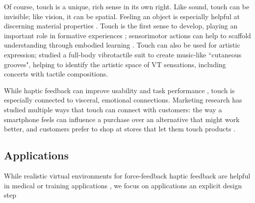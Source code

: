 Of course, touch is a unique, rich sense in its own right.
Like sound, touch can be invisible; like vision, it can be spatial.
Feeling an object is especially helpful at discerning material properties \cite{Lederman1987}.
Touch is the first sense to develop, playing an important role in formative experiences \cite{Jansson-Boyd2011};
sensorimotor actions can help to scaffold understanding through embodied learning \cite{Papert1980}.
Touch can also be used for artistic expression; \citet{Gunther2002} studied a full-body vibrotactile suit to create music-like ``cutaneous grooves", helping to identify the artistic space of VT sensations, including concerts with tactile compositions.

While haptic feedback can improve usability and task performance \cite{Pielot2009,Chan2008}, touch is especially connected to visceral, emotional connections.
Marketing research has studied multiple ways that touch can connect with customers:
the way a smartphone feels can influence a purchase over an alternative that might work better, and customers prefer to shop at stores that let them touch products \cite{Spence2011,Jansson-Boyd2011}.
















\subsection{Applications}
While realistic virtual environments for force-feedback haptic feedback are helpful in medical or training applications  \cite{Okamura2009,VanDerMeijden2009}, we focus on applications  an explicit  design step


